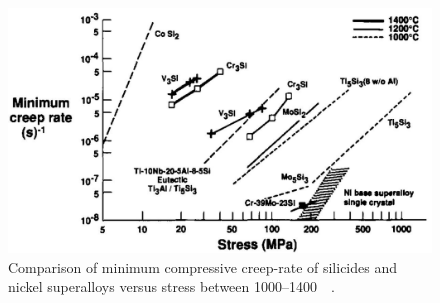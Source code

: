 %
\begin{figure}[H]
\begin{center}
\includegraphics[width=16cm]{creepshah92_2}
\caption{Comparison of minimum compressive creep-rate of silicides and nickel superalloys versus stress between 1000--1400\celsius\ ~\cite{shah92}.}\label{fig:creepshah92_2}
\end{center}
\end{figure}
%


